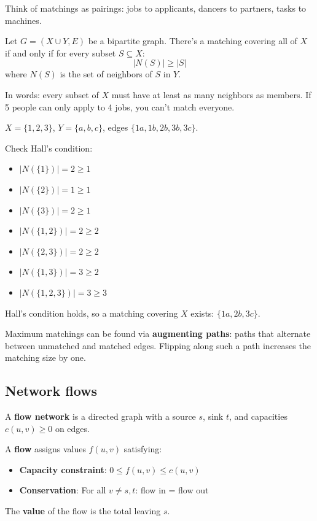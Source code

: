 Think of matchings as pairings: jobs to applicants, dancers to partners, tasks to machines.

\begin{theorem}
Let $G = (X \cup Y, E)$ be a bipartite graph. There's a matching covering all of $X$ if and only if for every subset $S \subseteq X$:
\[
|N(S)| \geq |S|
\]
where $N(S)$ is the set of neighbors of $S$ in $Y$.
\end{theorem}

In words: every subset of $X$ must have at least as many neighbors as members. If 5 people can only apply to 4 jobs, you can't match everyone.

\begin{example}
$X = \{1,2,3\}$, $Y = \{a,b,c\}$, edges $\{1a, 1b, 2b, 3b, 3c\}$.

Check Hall's condition:
\begin{itemize}
  \item $|N(\{1\})| = 2 \geq 1$ \checkmark
  \item $|N(\{2\})| = 1 \geq 1$ \checkmark
  \item $|N(\{3\})| = 2 \geq 1$ \checkmark
  \item $|N(\{1,2\})| = 2 \geq 2$ \checkmark
  \item $|N(\{2,3\})| = 2 \geq 2$ \checkmark
  \item $|N(\{1,3\})| = 3 \geq 2$ \checkmark
  \item $|N(\{1,2,3\})| = 3 \geq 3$ \checkmark
\end{itemize}
Hall's condition holds, so a matching covering $X$ exists: $\{1a, 2b, 3c\}$.
\end{example}

\begin{remark}
Maximum matchings can be found via \textbf{augmenting paths}: paths that alternate between unmatched and matched edges. Flipping along such a path increases the matching size by one.
\end{remark}

\subsection*{Network flows}

\begin{definition}
A \textbf{flow network} is a directed graph with a source $s$, sink $t$, and capacities $c(u,v) \geq 0$ on edges.

A \textbf{flow} assigns values $f(u,v)$ satisfying:
\begin{itemize}
  \item \textbf{Capacity constraint}: $0 \leq f(u,v) \leq c(u,v)$
  \item \textbf{Conservation}: For all $v \neq s,t$: flow in = flow out
\end{itemize}
The \textbf{value} of the flow is the total leaving $s$.
\end{definition}

